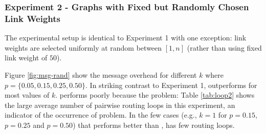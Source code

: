 



\subsubsection{Experiment 2 - \er Graphs with Fixed but Randomly Chosen Link Weights}
\label{subsec:expt2}


The experimental setup is identical to Experiment 1 with one exception: link weights are selected uniformly at random between $[1,n]$ (rather than using 
fixed link weight of $50$).

Figure \ref{fig:msg-rand} show the message overhead for different $k$ where $p=\{0.05,0.15,0.25,0.50 \}$. 
In striking contrast to Experiment 1, \purge outperforms \second for most values of $k$. 
\second performs poorly because the \infinity problem: Table \ref{tab:loop2} shows the large average number of pairwise routing loops in this experiment, 
an indicator of the occurrence of \infinity problem.
In the few cases (e.g., $k=1$ for $p=0.15$, $p=0.25$ and $p=0.50$) that \second performs better than \purges, \second has few routing loops.

